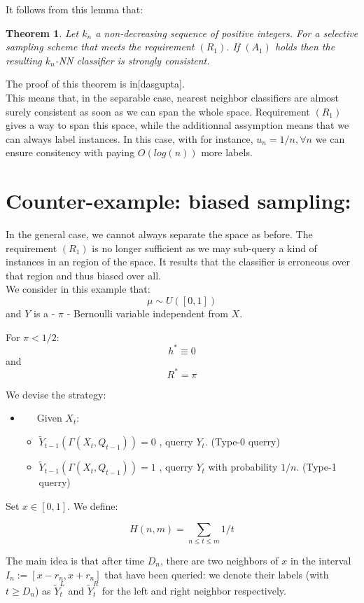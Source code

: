 \documentclass[onecolumn,12pt]{article}
\newtheorem{theorem}{Theorem}[section]
\begin{document}
It follows from this lemma that:
\begin{theorem}
Let $k_n$ a non-decreasing sequence of positive integers. For a selective sampling scheme that meets the requirement $(R_1)$. If $(A_1)$ holds then the resulting $k_n$-NN classifier is strongly consistent.
\end{theorem}

The proof of this theorem is in[dasgupta].\\

This means that, in the separable case, nearest neighbor classifiers are almost surely consistent as soon as we can span the whole space. Requirement $(R_1)$ gives a way to span this space, while the additionnal assymption means that we can always label instances. In this case, with for instance, $u_n=1/n , \forall n$ we can ensure consitency with paying $O(log(n))$ more labels. 

\section{Counter-example: biased sampling:}

In the general case, we cannot always separate the space as before. The requirement $(R_1)$ is no longer sufficient as we may sub-query a kind of instances in an region of the space. It results that the classifier is erroneous over that region and thus biased over all.\\

We consider in this example that:
$$\mu \sim U([0,1])$$ and $Y$ is a - $\pi$ - Bernoulli variable independent from $X$.

For $\pi <1/2$: $$h^*\equiv0$$ and
$$R^*=\pi$$

We devise the strategy:
\begin{itemize}
\item[$(S_1)$] \ \ \ Given $X_t$:
\begin{itemize}
\item[(i). \ \ \ ] $\tilde{Y}_{t-1}(\Gamma(X_t,Q_{t-1}))=0$ , querry $Y_t$. (Type-0 querry)
\item[(ii). \ \ \ ] $\tilde{Y}_{t-1}(\Gamma(X_t,Q_{t-1}))=1$ , querry $Y_t$ with probability $1/n$. (Type-1 querry)
\end{itemize}
\end{itemize}

Set $x \in [0,1]$. We define:

$$H(n,m)=\sum_{n\leq t \leq m}1/t$$


The main idea is that after time $D_n$, there are two neighbors of $x$ in the interval $I_n:=[x-r_n,x+r_n]$  that have been queried: we denote their labels (with $t \geq D_n$) as $\tilde{Y}^L_t$ and $\tilde{Y}^R_t$ for the left and right neighbor respectively. \\
\end{document}
